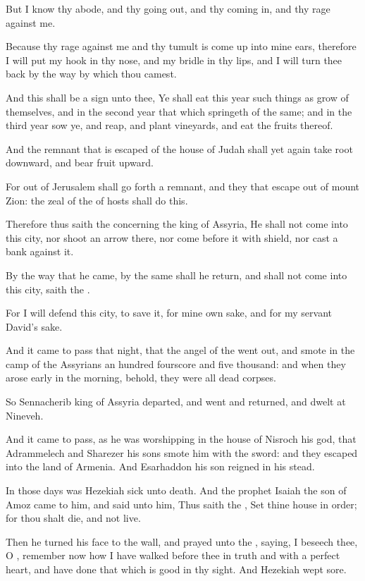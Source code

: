 \Verse But I know thy abode, and thy going out, and thy coming in, and thy rage against me.

\Verse Because thy rage against me and thy tumult is come up into mine ears, therefore I will put my hook in thy nose, and my bridle in thy lips, and I will turn thee back by the way by which thou camest.

\Verse And this shall be a sign unto thee, Ye shall eat this year such things as grow of themselves, and in the second year that which springeth of the same; and in the third year sow ye, and reap, and plant vineyards, and eat the fruits thereof.

\Verse And the remnant that is escaped of the house of Judah shall yet again take root downward, and bear fruit upward.

\Verse For out of Jerusalem shall go forth a remnant, and they that escape out of mount Zion: the zeal of the \LORD of hosts shall do this.

\Verse Therefore thus saith the \LORD concerning the king of Assyria, He shall not come into this city, nor shoot an arrow there, nor come before it with shield, nor cast a bank against it.

\Verse By the way that he came, by the same shall he return, and shall not come into this city, saith the \LORD.

\Verse For I will defend this city, to save it, for mine own sake, and for my servant David's sake.

\Verse And it came to pass that night, that the angel of the \LORD went out, and smote in the camp of the Assyrians an hundred fourscore and five thousand: and when they arose early in the morning, behold, they were all dead corpses.

\Verse So Sennacherib king of Assyria departed, and went and returned, and dwelt at Nineveh.

\Verse And it came to pass, as he was worshipping in the house of Nisroch his god, that Adrammelech and Sharezer his sons smote him with the sword: and they escaped into the land of Armenia. And Esarhaddon his son reigned in his stead.


\Chapter
\Verse In those days was Hezekiah sick unto death. And the prophet Isaiah the son of Amoz came to him, and said unto him, Thus saith the \LORD, Set thine house in order; for thou shalt die, and not live.

\Verse Then he turned his face to the wall, and prayed unto the \LORD, saying, \Verse I beseech thee, O \LORD, remember now how I have walked before thee in truth and with a perfect heart, and have done that which is good in thy sight. And Hezekiah wept sore.

